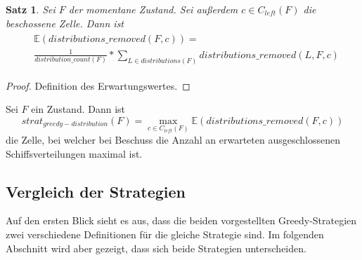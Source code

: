 \documentclass[a4paper,12pt]{llncs}
\numberwithin{equation}{section}
\newtheorem{satz}{Satz}
\begin{document}
\begin{satz}
Sei $F$ der momentane Zustand.
Sei außerdem $c \in C_{left}(F)$ die beschossene Zelle.
Dann ist
\begin{align}
\begin{split}
&\mathds{E}(distributions\_removed(F,c))=\\
&\frac{1}{distribution\_count(F)} * \sum_{L \in distributions(F)} distributions\_removed(L, F, c) \nonumber
\end{split}
\end{align}
\end{satz}

\begin{proof}
Definition des Erwartungswertes.
\end{proof}

\begin{definition}
Sei $F$ ein Zustand.
Dann ist
\[
strat_{greedy-distribution}(F)=\max_{c \in C_{left}(F)} \mathds{E}(distributions\_removed(F,c))
\]
die Zelle, bei welcher bei Beschuss die Anzahl an erwarteten ausgeschlossenen Schiffsverteilungen maximal ist.
\end{definition}

\subsection{Vergleich der Strategien}
Auf den ersten Blick sieht es aus, dass die beiden vorgestellten Greedy-Strategien zwei verschiedene Definitionen für die gleiche Strategie sind. Im folgenden Abschnitt wird aber gezeigt, dass sich beide Strategien unterscheiden.
\end{document}
